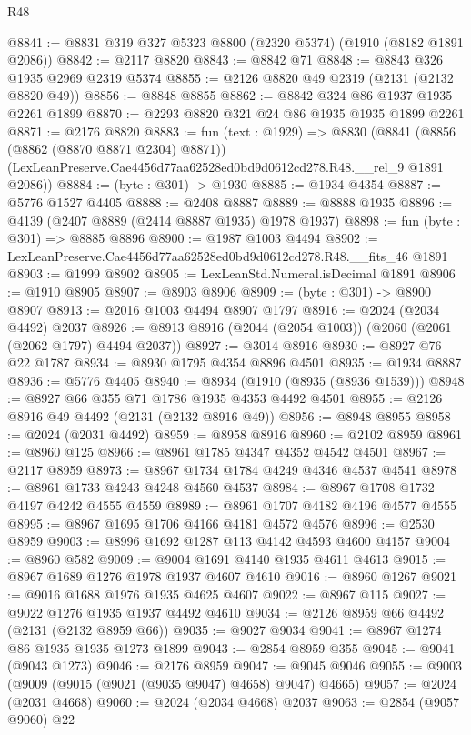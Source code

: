 \begin{lexlean}{R48}
\begin{coremodule}
@8841 := @8831 @319 @327 @5323 @8800 (@2320 @5374) (@1910 (@8182 @1891 @2086))
@8842 := @2117 @8820
@8843 := @8842 @71
@8848 := @8843 @326 @1935 @2969 @2319 @5374
@8855 := @2126 @8820 @49 @2319 (@2131 (@2132 @8820 @49))
@8856 := @8848 @8855
@8862 := @8842 @324 @86 @1937 @1935 @2261 @1899
@8870 := @2293 @8820 @321 @24 @86 @1935 @1935 @1899 @2261
@8871 := @2176 @8820
@8883 := fun (text : @1929) =>
  @8830
    (@8841
      (@8856 (@8862 (@8870 @8871 @2304) @8871))
      (LexLeanPreserve.Cae4456d77aa62528ed0bd9d0612cd278.R48.__rel_9 @1891 @2086))
@8884 := (byte : @301) -> @1930
@8885 := @1934 @4354
@8887 := @5776 @1527 @4405
@8888 := @2408 @8887
@8889 := @8888 @1935
@8896 := @4139 (@2407 @8889 (@2414 @8887 @1935) @1978 @1937)
@8898 := fun (byte : @301) => @8885 @8896
@8900 := @1987 @1003 @4494
@8902 := LexLeanPreserve.Cae4456d77aa62528ed0bd9d0612cd278.R48.__fits_46 @1891
@8903 := @1999 @8902
@8905 := LexLeanStd.Numeral.isDecimal @1891
@8906 := @1910 @8905
@8907 := @8903 @8906
@8909 := (byte : @301) -> @8900 @8907
@8913 := @2016 @1003 @4494 @8907 @1797
@8916 := @2024 (@2034 @4492) @2037
@8926 := @8913 @8916 (@2044 (@2054 @1003)) (@2060 (@2061 (@2062 @1797) @4494 @2037))
@8927 := @3014 @8916
@8930 := @8927 @76 @22 @1787
@8934 := @8930 @1795 @4354 @8896 @4501
@8935 := @1934 @8887
@8936 := @5776 @4405
@8940 := @8934 (@1910 (@8935 (@8936 @1539)))
@8948 := @8927 @66 @355 @71 @1786 @1935 @4353 @4492 @4501
@8955 := @2126 @8916 @49 @4492 (@2131 (@2132 @8916 @49))
@8956 := @8948 @8955
@8958 := @2024 (@2031 @4492)
@8959 := @8958 @8916
@8960 := @2102 @8959
@8961 := @8960 @125
@8966 := @8961 @1785 @4347 @4352 @4542 @4501
@8967 := @2117 @8959
@8973 := @8967 @1734 @1784 @4249 @4346 @4537 @4541
@8978 := @8961 @1733 @4243 @4248 @4560 @4537
@8984 := @8967 @1708 @1732 @4197 @4242 @4555 @4559
@8989 := @8961 @1707 @4182 @4196 @4577 @4555
@8995 := @8967 @1695 @1706 @4166 @4181 @4572 @4576
@8996 := @2530 @8959
@9003 := @8996 @1692 @1287 @113 @4142 @4593 @4600 @4157
@9004 := @8960 @582
@9009 := @9004 @1691 @4140 @1935 @4611 @4613
@9015 := @8967 @1689 @1276 @1978 @1937 @4607 @4610
@9016 := @8960 @1267
@9021 := @9016 @1688 @1976 @1935 @4625 @4607
@9022 := @8967 @115
@9027 := @9022 @1276 @1935 @1937 @4492 @4610
@9034 := @2126 @8959 @66 @4492 (@2131 (@2132 @8959 @66))
@9035 := @9027 @9034
@9041 := @8967 @1274 @86 @1935 @1935 @1273 @1899
@9043 := @2854 @8959 @355
@9045 := @9041 (@9043 @1273)
@9046 := @2176 @8959
@9047 := @9045 @9046
@9055 := @9003 (@9009 (@9015 (@9021 (@9035 @9047) @4658) @9047) @4665)
@9057 := @2024 (@2031 @4668)
@9060 := @2024 (@2034 @4668) @2037
@9063 := @2854 (@9057 @9060) @22

\end{coremodule}
\end{lexlean}
